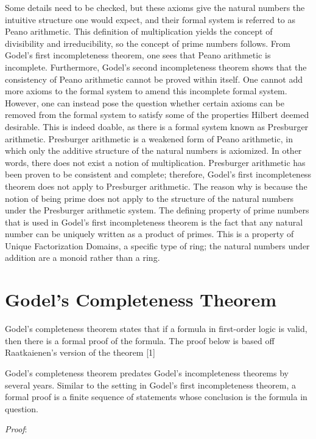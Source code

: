 \documentclass[%
 reprint,
 amsmath,amssymb,
 aps,
]{revtex4-2}
\begin{document}
    Some details need to be checked, but these axioms give the natural numbers the intuitive structure one would expect, and their formal system is referred to as Peano arithmetic.  This definition of multiplication yields the concept of divisibility and irreducibility, so the concept of prime numbers follows.  From Godel's first incompleteness theorem, one sees that Peano arithmetic is incomplete.  Furthermore, Godel's second incompleteness theorem shows that the consistency of Peano arithmetic cannot be proved within itself.  One cannot add more axioms to the formal system to amend this incomplete formal system.  However, one can instead pose the question whether certain axioms can be removed from the formal system to satisfy some of the properties Hilbert deemed desirable.  This is indeed doable, as there is a formal system known as Presburger arithmetic.  Presburger arithmetic is a weakened form of Peano arithmetic, in which only the additive structure of the natural numbers is axiomized.  In other words, there does not exist a notion of multiplication.  Presburger arithmetic has been proven to be consistent and complete; therefore, Godel's first incompleteness theorem does not apply to Presburger arithmetic.  The reason why is because the notion of being prime does not apply to the structure of the natural numbers under the Presburger arithmetic system.  The defining property of prime numbers that is used in Godel's first incompleteness theorem is the fact that any natural number can be uniquely written as a product of primes.  This is a property of Unique Factorization Domains, a specific type of ring; the natural numbers under addition are a monoid rather than a ring.  
    
    

\section{Godel's Completeness Theorem}

Godel's completeness theorem states that if a formula in first-order logic is valid, then there is a formal proof of the formula.  The proof below is based off Raatkaienen's version of the theorem [1]    

Godel's completeness theorem predates Godel's incompleteness theorems by several years.  Similar to the setting in Godel's first incompleteness theorem, a formal proof is a finite sequence of statements whose conclusion is the formula in question.  

\textit{Proof}:
\end{document}
